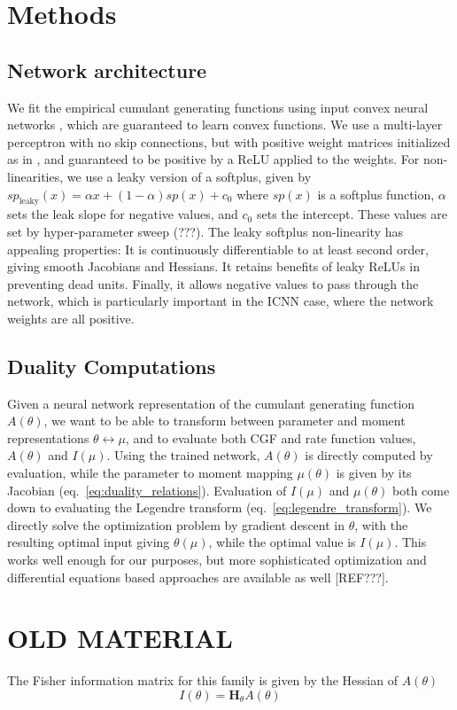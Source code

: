 \documentclass[10pt]{article}      %
\begin{document}
\section{Methods}
\subsection{Network architecture}

We fit the empirical cumulant generating functions using input convex neural networks \cite{amos_input_2017}, which are guaranteed to learn convex functions.
We use a multi-layer perceptron with no skip connections, but with positive weight matrices initialized as in \cite{hoedt_principled_2023}, and guaranteed to be positive by a ReLU applied to the weights.
For non-linearities, we use a leaky version of a softplus, given by $sp_{\textrm{leaky}}(x) = \alpha x + (1 - \alpha) sp(x) + c_0$ where $sp(x)$ is a softplus function, $\alpha$ sets the leak slope for negative values, and $c_0$ sets the intercept. 
These values are set by hyper-parameter sweep (???). 
The leaky softplus non-linearity has appealing properties:
It is continuously differentiable to at least second order, giving smooth Jacobians and Hessians.
It retains benefits of leaky ReLUs in preventing dead units.
Finally, it allows negative values to pass through the network, which is particularly important in the ICNN case, where the network weights are all positive.




\subsection{Duality Computations}
Given a neural network representation of the cumulant generating function $A(\theta)$, we want to be able to transform between parameter and moment representations $\theta \leftrightarrow \mu$, and to evaluate both CGF and rate function values, $A(\theta)$ and $I(\mu)$.
Using the trained network, $A(\theta)$ is directly computed by evaluation, while the parameter to moment mapping $\mu(\theta)$ is given by its Jacobian (eq.~\ref{eq:duality_relations}).
Evaluation of $I(\mu)$ and $\mu(\theta)$ both come down to evaluating the Legendre transform (eq.~\ref{eq:legendre_transform}). 
We directly solve the optimization problem by gradient descent in $\theta$, with the resulting optimal input giving $\theta(\mu)$, while the optimal value is $I(\mu)$.
This works well enough for our purposes, but more sophisticated optimization and differential equations based approaches are available as well [REF???].



\section{OLD MATERIAL}

The Fisher information matrix for this family is given by the Hessian of $A(\theta)$ 
\begin{equation}
  I(\theta) = \bm{H}_\theta A(\theta) 
\end{equation}




\end{document}
